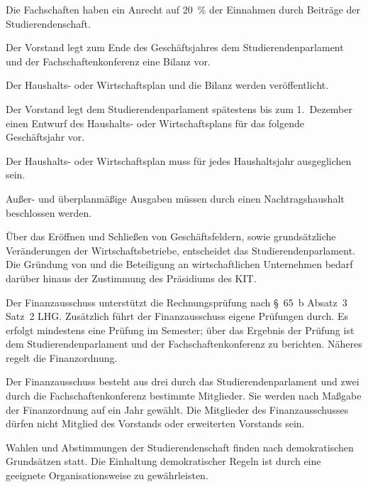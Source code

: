 \begin{jurdoc}
Die Fachschaften haben ein Anrecht auf 20~\% der Einnahmen durch Beiträge der Studierendenschaft. \label{haushalt:fachschaftsgelder}

Der Vorstand legt zum Ende des Geschäftsjahres dem Studierendenparlament und der Fachschaftenkonferenz eine Bilanz vor.

Der Haushalts- oder Wirtschaftsplan und die Bilanz werden veröffentlicht.


 \label{haushalt:haushaltsplan}

Der Vorstand legt dem Studierendenparlament spätestens bis zum 1.~Dezember einen Entwurf des Haushalts- oder Wirtschaftsplans für das folgende Geschäftsjahr vor.

Der Haushalts- oder Wirtschaftsplan muss für jedes Haushaltsjahr ausgeglichen sein.

Außer- und überplanmäßige Ausgaben müssen durch einen Nachtragshaushalt beschlossen werden.

Über das Eröffnen und Schließen von Geschäftsfeldern, sowie grundsätzliche Veränderungen der Wirtschaftsbetriebe, entscheidet das Studierendenparlament. Die Gründung von und die Beteiligung an wirtschaftlichen Unternehmen bedarf darüber hinaus der Zustimmung des Präsidiums des KIT.


 \label{haushalt:finanzauschuss}

Der Finanzausschuss unterstützt die Rechnungsprüfung nach §~65~b Absatz~3 Satz~2 LHG. Zusätzlich führt der Finanzausschuss eigene Prüfungen durch. Es erfolgt mindestens eine Prüfung im Semester; über das Ergebnis der Prüfung ist dem Studierendenparlament und der Fachschaftenkonferenz zu berichten. Näheres regelt die Finanzordnung.

Der  Finanzausschuss besteht aus drei durch das Studierendenparlament und  zwei durch die Fachschaftenkonferenz bestimmte Mitglieder. Sie werden nach Maßgabe der Finanzordnung auf ein Jahr gewählt. Die Mitglieder des Finanzausschusses dürfen nicht Mitglied des Vorstands oder erweiterten Vorstands sein. \label{haushalt:finanzausschuss:wahl}


%
%


\label{grundsaetze:wahlen}

Wahlen und Abstimmungen der Studierendenschaft finden nach demokratischen Grundsätzen statt. Die Einhaltung demokratischer Regeln ist durch eine geeignete Organisationsweise zu gewährleisten.


\end{jurdoc}
